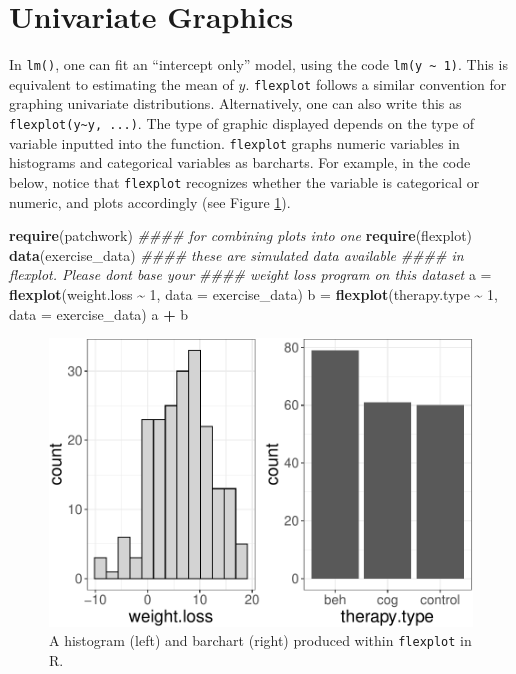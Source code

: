 \documentclass[
  man]{apa6}
\newenvironment{Shaded}{\begin{snugshade}}{\end{snugshade}}
\newcommand{\CommentTok}[1]{\textcolor[rgb]{0.56,0.35,0.01}{\textit{#1}}}
\newcommand{\DataTypeTok}[1]{\textcolor[rgb]{0.13,0.29,0.53}{#1}}
\newcommand{\DecValTok}[1]{\textcolor[rgb]{0.00,0.00,0.81}{#1}}
\newcommand{\KeywordTok}[1]{\textcolor[rgb]{0.13,0.29,0.53}{\textbf{#1}}}
\newcommand{\NormalTok}[1]{#1}
\newcommand{\OperatorTok}[1]{\textcolor[rgb]{0.81,0.36,0.00}{\textbf{#1}}}
\newcommand{\StringTok}[1]{\textcolor[rgb]{0.31,0.60,0.02}{#1}}
\begin{document}
\hypertarget{univariate-graphics}{%
\section{Univariate Graphics}\label{univariate-graphics}}

In \texttt{lm()}, one can fit an ``intercept only'' model, using the code \texttt{lm(y\ \textasciitilde{}\ 1)}. This is equivalent to estimating the mean of \(y\). \texttt{flexplot} follows a similar convention for graphing univariate distributions. Alternatively, one can also write this as \texttt{flexplot(y\textasciitilde{}y,\ ...)}. The type of graphic displayed depends on the type of variable inputted into the function. \texttt{flexplot} graphs numeric variables in histograms and categorical variables as barcharts. For example, in the code below, notice that \texttt{flexplot} recognizes whether the variable is categorical or numeric, and plots accordingly (see Figure \ref{fig:bar}).

\small

\begin{Shaded}
\begin{Highlighting}[]
\KeywordTok{require}\NormalTok{(patchwork) }\CommentTok{\#\#\#\# for combining plots into one}
\KeywordTok{require}\NormalTok{(flexplot)}
\KeywordTok{data}\NormalTok{(exercise\_data) }\CommentTok{\#\#\#\# these are simulated data available }
                    \CommentTok{\#\#\#\# in flexplot. Please don\textquotesingle{}t base your }
                    \CommentTok{\#\#\#\# weight loss program on this dataset}
\NormalTok{a =}\StringTok{ }\KeywordTok{flexplot}\NormalTok{(weight.loss }\OperatorTok{\textasciitilde{}}\StringTok{ }\DecValTok{1}\NormalTok{, }\DataTypeTok{data =}\NormalTok{ exercise\_data)}
\NormalTok{b =}\StringTok{ }\KeywordTok{flexplot}\NormalTok{(therapy.type }\OperatorTok{\textasciitilde{}}\StringTok{ }\DecValTok{1}\NormalTok{, }\DataTypeTok{data =}\NormalTok{ exercise\_data)}
\NormalTok{a }\OperatorTok{+}\StringTok{ }\NormalTok{b}
\end{Highlighting}
\end{Shaded}

\begin{figure}
\centering
\includegraphics{flexplot_psychmeth_files/figure-latex/bar-1.pdf}
\caption{\label{fig:bar}A histogram (left) and barchart (right) produced within \texttt{flexplot} in R.}
\end{figure}
\end{document}
